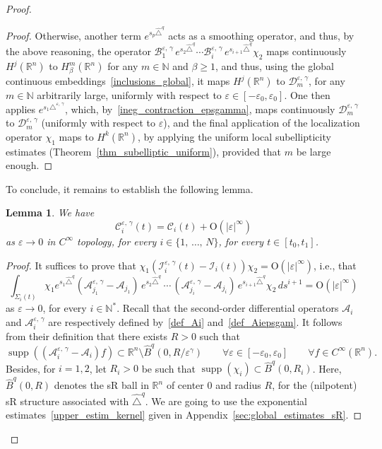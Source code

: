 \documentclass[10pt]{amsart}
\newtheorem{lemm}[theo]{Lemma}\newtheorem{prop}[theo]{Proposition}\newtheorem{coro}[theo]{Corollary}\newtheorem{conj}[theo]{Conjecture}
\theoremstyle{definition}\newtheorem{defi}[theo]{Definition}\newtheorem{rema}[theo]{Remark}\newtheorem{exam}[theo]{Example}\newtheorem{exem}[theo]{Example}\newtheorem{nota}[theo]{Notation}
\newcommand*\R{\mathbb{R}}
\newcommand*\N{\mathbb{N}}
\newcommand{\calA}{\mathcal{A}}
\newcommand{\calC}{\mathcal{C}}
\newcommand{\calI}{\mathcal{I}}
\newcommand{\calB}{\mathcal{B}}
\newcommand{\calD}{\mathcal{D}}
\newcommand{\rmO}{\mathrm{O}}
\DeclareMathOperator{\supp}{supp}
\renewcommand{\geq}{\geqslant}
\let\oldforall\forall
\renewcommand*{\forall}{\mathrel{\oldforall}}
\begin{document}
\begin{proof}
\begin{proof}
Otherwise, another term $e^{s_p\widehat{\triangle}^q}$ acts as a smoothing operator, and thus, by the above reasoning, the operator $\calB_{1}^{\varepsilon,\,\gamma} \, e^{s_2 \widehat{\triangle}^{q}}
\cdots \calB_i^{\varepsilon,\,\gamma} \, e^{s_{i+1}
\widehat{\triangle}^{q}} \chi_2$ maps continuously $H^j(\R^n)$ to $H^m_\beta(\R^n)$ for any $m\in\N$ and $\beta\geq 1$, and thus, using the global continuous embeddings~\eqref{inclusions_global}, it maps $H^j(\R^n)$ to $\calD^{\varepsilon,\,\gamma}_m$, for any $m\in\N$ arbitrarily large, uniformly with respect to $\varepsilon\in[-\varepsilon_0,\varepsilon_0]$. One then applies $e^{s_1\triangle^{\varepsilon,\,\gamma}}$, which, by~\eqref{ineg_contraction_epsgamma}, maps continuously $\calD^{\varepsilon,\,\gamma}_m$ to $\calD^{\varepsilon,\,\gamma}_m$ (uniformly with respect to $\varepsilon$), and the final application of the localization operator $\chi_1$ maps to $H^k(\R^n)$, by applying the uniform local subellipticity estimates (Theorem~\ref{thm_subelliptic_uniform}), provided that $m$ be large enough.
\end{proof}

To conclude, it remains to establish the following lemma.

\begin{lemm}\label{lemm6.10}
We have
\[
\calC_i^{\varepsilon,\,\gamma}(t) = \calC_i(t) + \rmO(\vert\varepsilon\vert^\infty)
\]
as $\varepsilon\rightarrow 0$ in $C^\infty$ topology, for every $i\in\{1,\,\ldots,\,N\}$, for every $t\in[t_0,t_1]$.
\end{lemm}

\begin{proof}
It suffices to prove that $\chi_1 (\calI_i^{\varepsilon,\,\gamma}(t) - \calI_i(t))\chi_2 = \rmO(\vert\varepsilon\vert^\infty)$, i.e., that
\begin{equation}\label{int_diffA}
\int_{\Sigma_i(t)} \chi_1 e^{s_1 \widehat{\triangle}^{q}} \left(\calA_{j_1}^{\varepsilon,\,\gamma} - \calA_{j_1}\right) \, e^{s_2 \widehat{\triangle}^{q}}\,\cdots\,\left(\calA_{j_i}^{\varepsilon,\,\gamma} - \calA_{j_i}\right) \, e^{s_{i+1} \widehat{\triangle}^{q}} \chi_2 \, ds^{i+1} = \rmO(\vert\varepsilon\vert^\infty)
\end{equation}
as $\varepsilon\rightarrow 0$, for every $i\in\N^*$. Recall that the second-order differential operators $\calA_i$ and $\calA_i^{\varepsilon,\,\gamma}$ are respectively defined by~\eqref{def_Ai} and~\eqref{def_Aiepsgam}. It follows from their definition that there exists $R>0$ such that
\[
\supp\left(\left(\calA_i^{\varepsilon,\,\gamma} - \calA_i\right) f \right) \subset \R^n \setminus\widehat{B}^q(0,R/\varepsilon^\gamma) \qquad \forall \varepsilon\in[-\varepsilon_0,\varepsilon_0]\qquad\forall f\in C^\infty(\R^n).
\]
Besides, for $i=1,2$, let $R_i>0$ be such that $\supp(\chi_i)\subset \widehat{B}^q(0,R_i)$. Here, $\widehat{B}^q(0,R)$ denotes the sR ball in $\R^n$ of center $0$ and radius $R$, for the (nilpotent) sR structure associated with $\widehat{\triangle}^{q}$. We are going to use the exponential estimates~\eqref{upper_estim_kernel} given in Appendix~\ref{sec:global_estimates_sR}.


\end{proof}
\end{proof}
\end{document}
